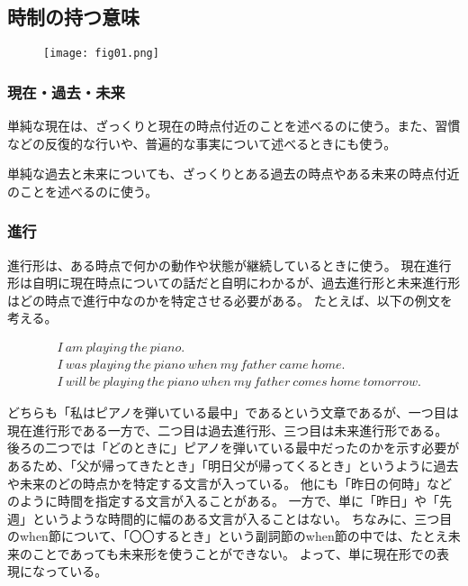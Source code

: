 \subsection{時制の持つ意味}

\begin{figure}[h]
  \centering
  \texttt{[image: fig01.png]}
\end{figure}

\subsubsection{現在・過去・未来}

単純な現在は、ざっくりと現在の時点付近のことを述べるのに使う。また、習慣などの反復的な行いや、普遍的な事実について述べるときにも使う。

単純な過去と未来についても、ざっくりとある過去の時点やある未来の時点付近のことを述べるのに使う。

\subsubsection{進行}

進行形は、ある時点で何かの動作や状態が継続しているときに使う。
現在進行形は自明に現在時点についての話だと自明にわかるが、過去進行形と未来進行形はどの時点で進行中なのかを特定させる必要がある。
たとえば、以下の例文を考える。

\begin{align}
  &I ~ am ~ playing ~ the ~ piano \text{.}\\
  &I ~ was ~ playing ~ the ~ piano ~ when ~ my ~ father ~ came ~ home \text{.}\\
  &I ~ will ~ be ~ playing ~ the ~ piano ~ when ~ my ~ father ~ comes ~ home ~ tomorrow \text{.}
\end{align}

どちらも「私はピアノを弾いている最中」であるという文章であるが、一つ目は現在進行形である一方で、二つ目は過去進行形、三つ目は未来進行形である。
後ろの二つでは「どのときに」ピアノを弾いている最中だったのかを示す必要があるため、「父が帰ってきたとき」「明日父が帰ってくるとき」というように過去や未来のどの時点かを特定する文言が入っている。
他にも「昨日の何時」などのように時間を指定する文言が入ることがある。
一方で、単に「昨日」や「先週」というような時間的に幅のある文言が入ることはない。
ちなみに、三つ目のwhen節について、「〇〇するとき」という副詞節のwhen節の中では、たとえ未来のことであっても未来形を使うことができない。
よって、単に現在形での表現になっている。

